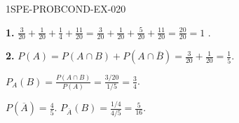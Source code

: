 \begin{corrige}{1SPE-PROBCOND-EX-020}

\textbf{1.} $\frac{3}{20}+\frac{1}{20}+\frac{1}{4}+\frac{11}{20} = \frac{3}{20}+\frac{1}{20}+\frac{5}{20}+\frac{11}{20} = \frac{20}{20} = 1$ \checkmark.

\medskip
\textbf{2.} $P(A) = P(A \cap B) + P(A \cap \overline{B}) = \frac{3}{20}+\frac{1}{20} = \frac{1}{5}$.

$P_A(B) = \frac{P(A \cap B)}{P(A)} = \frac{3/20}{1/5} = \frac{3}{4}$.

$P(\overline{A}) = \frac{4}{5}$. $P_{\overline{A}}(B) = \frac{1/4}{4/5} = \frac{5}{16}$.

\end{corrige}
